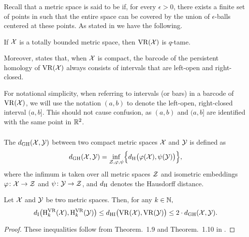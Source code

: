 \subsubsection{}

Recall that a metric space is said to be  if, for every $\epsilon > 0$, there exists a finite set of points in such that the entire space can be covered by the union of $\epsilon$-balls centered at these points.
As stated in \cite[Prop.~5.1]{chazal2014geometric} we have the following.

\medskip\lemma
If $\cX$ is a totally bounded metric space, then $\VR(\cX)$ is $q$-tame.
\medskip

Moreover, \cite[Thm.~5.2]{lim2020vietoris} states that, when $\cX$ is compact, the barcode of the persistent homology of $\VR(\cX)$ always consists of intervals that are left-open and right-closed.

For notational simplicity, when referring to intervals (or bars) in a barcode of $\VR(\cX)$, we will use the notation $(a, b)$ to denote the left-open, right-closed interval $(a, b]$.
This should not cause confusion, as $(a, b)$ and $(a, b]$ are identified with the same point in $\R^2$.


\subsubsection{}\label{thm:stability-HI}

The  $\dgh(\cX, \cY)$ between two compact metric spaces $\cX$ and $\cY$ is defined as
\[
\dgh(\cX, \cY) = \inf_{\cZ, \varphi, \psi} \set[\Big]{d_\rH\big(\varphi(\cX), \psi(\cY)\big)},
\]
where the infimum is taken over all metric spaces $\cZ$ and isometric embeddings $\varphi \colon \cX \to \cZ$ and $\psi \colon \cY \to \cZ$, and $d_\rH$ denotes the Hausdorff distance.

\medskip\theorem Let $\cX$ and $\cY$ be two metric spaces.
Then, for any $k \in \N,$
\[
\di\big(\rH_k^\VR(\cX), \rH_k^\VR(\cY)\big) \leq
\dhi\big(\VR(\cX), \VR(\cY)\big) \leq
2 \cdot \dgh(\cX, \cY).
\]

\begin{proof}
	These inequalities follow from Theorem.~1.9 and Theorem.~1.10 in \cite{blumberg2023interleaving}.
\end{proof}